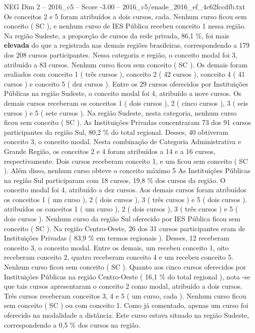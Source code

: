 \begin{textsample}{NEG Dim 2 – 2016\_c5 – Score -3.00 – 2016\_c5/enade\_2016\_ef\_4c62fccdfb.txt}
Os conceitos 2 e 5 foram atribuídos a dois cursos, cada.
Nenhum curso ficou sem conceito ( SC ), e nenhum curso de IES Pública recebeu conceito 1 nessa região.
Na região Sudeste, a proporção de cursos da rede privada, 86,1 \%, foi mais \textbf{elevada} do que a registrada nas demais regiões brasileiras, correspondendo a 179 dos 208 cursos participantes.
Nessa categoria e região, o conceito modal foi 3, atribuído a 83 cursos.
Nenhum curso ficou sem conceito ( SC ).
Os demais foram avaliados com conceito 1 ( três cursos ), conceito 2 ( 42 cursos ), conceito 4 ( 41 cursos ) e conceito 5 ( dez cursos ).
Entre os 29 cursos oferecidos por Instituições Públicas na região Sudeste, o conceito modal foi 4, atribuído a nove cursos.
Os demais cursos receberam os conceitos 1 ( dois cursos ), 2 ( cinco cursos ), 3 ( seis cursos ) e 5 ( sete cursos ).
Na região Sudeste, nesta categoria, nenhum curso ficou sem conceito ( SC ).
As Instituições Privadas concentraram 73 dos 91 cursos participantes da região Sul, 80,2 \% do total regional.
Desses, 40 obtiveram conceito 3, o conceito modal.
Nesta combinação de Categoria Administrativa e Grande Região, os conceitos 2 e 4 foram atribuídos a 14 e a 16 cursos, respectivamente.
Dois cursos receberam conceito 1, e um ficou sem conceito ( SC ).
Além disso, nenhum curso obteve o conceito máximo 5 As Instituições Públicas na região Sul participaram com 18 cursos, 19,8 \% dos cursos da região.
O conceito modal foi 4, atribuído a dez cursos.
Aos demais cursos foram atribuídos os conceitos 1 ( um curso ), 2 ( dois cursos ), 3 ( três cursos ) e 5 ( dois cursos ). atribuídos os conceitos 1 ( um curso ), 2 ( dois cursos ), 3 ( três cursos ) e 5 ( dois cursos ).
Nenhum curso da região Sul oferecido por IES Pública ficou sem conceito ( SC ).
Na região Centro-Oeste, 26 dos 31 cursos participantes eram de Instituições Privadas ( 83,9 \% em termos regionais ).
Desses, 12 receberam conceito 3, o conceito modal.
Entre os demais, um recebeu conceito 1, oito receberam conceito 2, quatro receberam conceito 4 e um recebeu conceito 5.
Nenhum curso ficou sem conceito ( SC ).
Quanto aos cinco cursos oferecidos por Instituições Públicas na região Centro-Oeste ( 16,1 \% do total regional ), nota -se que tais cursos apresentaram o conceito 2 como modal, atribuído a dois cursos.
Três cursos receberam conceitos 3, 4 e 5 ( um curso, cada ).
Nenhum curso ficou sem conceito ( SC ) ou com conceito 1.
Como já comentado, apenas um curso foi oferecido na modalidade a distância.
Este curso estava situado na região Sudeste, correspondendo a 0,5 \% dos cursos na região.

\end{textsample}

